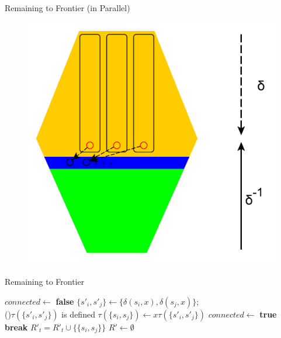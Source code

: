 \documentclass{beamer}
\begin{document}
\begin{frame}{Remaining to Frontier (in Parallel)}
	\begin{figure}
		\includegraphics[height=\textheight]{figs/r2f_parallel.pdf}
	\end{figure}
\end{frame}

\begin{frame}{Remaining to Frontier}
\footnotesize
\begin{algorithm}[H]
	\caption{BFS\_step\_R2F (in parallel)}
	\label{algo:BFS-step-R2F-Parallel}
	
	
		{
			$connected  \longleftarrow $ {\bf false}\;
			{
				$\{ s'_i, s'_j \}\longleftarrow \{ \delta(s_i,x),\delta(s_j,x) \}$; \\ 

				\If(){$\tau(\{ s'_i, s'_j \})$ is defined}
				{
					$\tau( \{ s_i, s_j\}) \longleftarrow x \tau(\{ s'_i, s'_j \})$\;
					$connected  \longleftarrow $ {\bf true}\;
					{\bf break}\;
				}
			}
			{
					$R'_t = R'_t \cup \{ \{ s_i, s_j \} \} $\;
			}
		}
		$R' \longleftarrow \emptyset$\;
\end{algorithm}
\end{frame}
\end{document}

